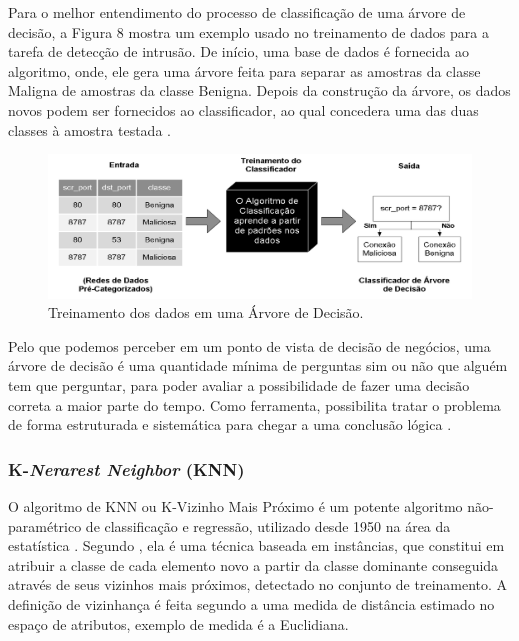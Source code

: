\par
Para o melhor entendimento do processo de classificação de uma árvore de decisão, a Figura 8 mostra um exemplo usado no treinamento de dados para a tarefa de detecção de intrusão. De início, uma base de dados é fornecida ao algoritmo, onde, ele gera uma árvore feita para separar as amostras da classe Maligna de amostras da classe Benigna. Depois da construção da árvore, os dados novos podem ser fornecidos ao classificador, ao qual concedera uma das duas classes à amostra testada \cite{Henke2011}. 

\begin{figure}[!htp]
	\begin{center}
    \caption{\label{fig:waveform_fig} Treinamento dos dados em uma Árvore de Decisão.}
	\includegraphics[scale=0.50]{Figuras/Arvore_decisao.png}
	\end{center}
\end{figure}

\par
Pelo que podemos perceber em um ponto de vista de decisão de negócios, uma árvore de decisão é uma quantidade mínima de perguntas sim ou não que alguém tem que perguntar, para poder avaliar a possibilidade de fazer uma decisão correta a maior parte do tempo. Como ferramenta, possibilita tratar o problema de forma estruturada e sistemática para chegar a uma conclusão lógica \cite{Sara}. 


\subsubsection{K-\textit{Nerarest Neighbor} (KNN)}

\par
O algoritmo de KNN ou K-Vizinho Mais Próximo é um potente algoritmo não-paramétrico de classificação e regressão, utilizado desde 1950 na área da estatística \cite{Carvalho2014}. Segundo , ela é uma técnica baseada em instâncias, que constitui em atribuir a classe de cada elemento novo a partir da classe dominante conseguida através de seus vizinhos mais próximos, detectado no conjunto de treinamento. A definição de vizinhança é feita segundo a uma medida de distância estimado no espaço de atributos, exemplo de medida é a Euclidiana. 

